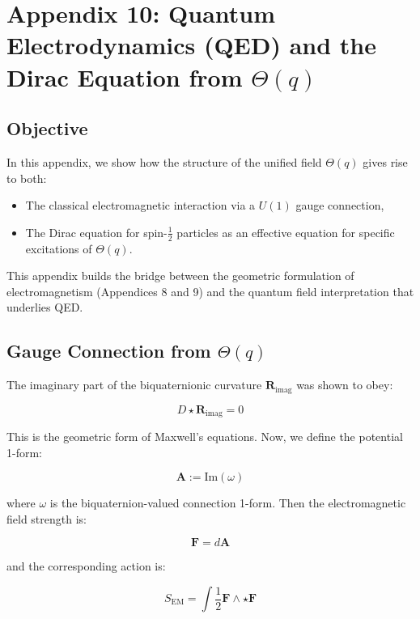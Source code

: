 

\section*{Appendix 10: Quantum Electrodynamics (QED) and the Dirac Equation from \(\Theta(q)\)}

\subsection*{Objective}

In this appendix, we show how the structure of the unified field \(\Theta(q)\) gives rise to both:
\begin{itemize}
  \item The classical electromagnetic interaction via a \(U(1)\) gauge connection,
  \item The Dirac equation for spin-\(\frac{1}{2}\) particles as an effective equation for specific excitations of \(\Theta(q)\).
\end{itemize}

This appendix builds the bridge between the geometric formulation of electromagnetism (Appendices 8 and 9)
and the quantum field interpretation that underlies QED.

\subsection*{Gauge Connection from \(\Theta(q)\)}

The imaginary part of the biquaternionic curvature \(\mathbf{R}_{\text{imag}}\) was shown to obey:

\[
D \star \mathbf{R}_{\text{imag}} = 0
\]

This is the geometric form of Maxwell's equations. Now, we define the potential 1-form:

\[
\mathbf{A} := \text{Im}(\omega)
\]

where \(\omega\) is the biquaternion-valued connection 1-form. Then the electromagnetic field strength is:

\[
\mathbf{F} = d\mathbf{A}
\]

and the corresponding action is:

\[
S_{\text{EM}} = \int \frac{1}{2} \mathbf{F} \wedge \star \mathbf{F}
\]

